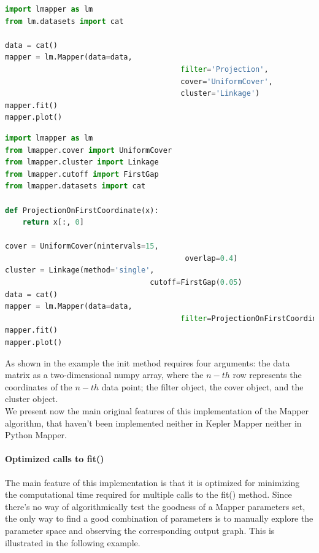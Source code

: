 \begin{lstlisting}[language=Python, caption=Example 3 for the Mapper class. The arguments of the init function can be strings.]
import lmapper as lm
from lm.datasets import cat

data = cat()
mapper = lm.Mapper(data=data,
										filter='Projection',
										cover='UniformCover',
										cluster='Linkage')
mapper.fit()
mapper.plot()
\end{lstlisting}

\begin{lstlisting}[language=Python, caption=Example 4 for the Mapper class. The filter given to the init function of the Mapper object can be a Python function.]
import lmapper as lm
from lmapper.cover import UniformCover
from lmapper.cluster import Linkage
from lmapper.cutoff import FirstGap
from lmapper.datasets import cat

def ProjectionOnFirstCoordinate(x):
	return x[:, 0]
	
cover = UniformCover(nintervals=15,
										 overlap=0.4)
cluster = Linkage(method='single',
								 cutoff=FirstGap(0.05)
data = cat()
mapper = lm.Mapper(data=data,
										filter=ProjectionOnFirstCoordinate)
mapper.fit()
mapper.plot()
\end{lstlisting}


As shown in the example the init method requires four arguments: the data matrix as a two-dimensional numpy array, where the $n-th$ row represents the coordinates of the $n-th$ data point; the filter object, the cover object, and the cluster object. \\
We present now the main original features of this implementation of the Mapper algorithm, that haven't been implemented neither in Kepler Mapper neither in Python Mapper.

\paragraph{Optimized calls to fit()}
The main feature of this implementation is that it is optimized for minimizing the computational time required for multiple calls to the fit() method. Since there's no way of algorithmically test the goodness of a Mapper parameters set, the only way to find a good combination of parameters is to manually explore the parameter space and observing the corresponding output graph. This is illustrated in the following example.

